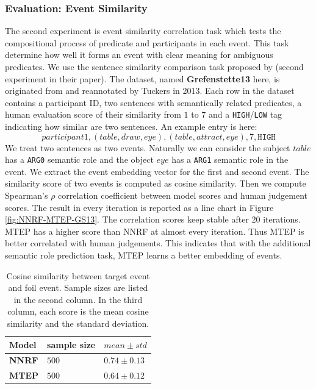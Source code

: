 \documentclass[a4paper]{article}
\begin{document}
\subsubsection{Evaluation: Event Similarity} \label{sec:comp-eventsim}
The second experiment is event similarity correlation task which tests the compositional process of predicate and participants in each event. This task determine how well it forms an event with clear meaning for ambiguous predicates. We use the sentence similarity comparison task proposed by \citet{grefenstette2015concrete} (second experiment in their paper). The dataset, named \textbf{Grefenstette13} here, is originated from \citet{grefenstette2011experimental} and reannotated by Tuckers in 2013. Each row in the dataset contains a participant ID, two sentences with semantically related predicates, a human evaluation score of their similarity from $1$ to $7$ and a \texttt{HIGH}/\texttt{LOW} tag indicating how similar are two sentences. An example entry is here:
\begin{equation} \label{eg:event-sim}
    participant1, (table, draw, eye), (table, attract, eye), 7, \texttt{HIGH}
\end{equation}
We treat two sentences as two events. Naturally we can consider the subject $table$ has a \texttt{ARG0} semantic role and the object $eye$ has a \texttt{ARG1} semantic role in the event. We extract the event embedding vector for the first and second event. The similarity score of two events is computed as cosine similarity. Then we compute Spearman's $\rho$ correlation coefficient between model scores and human judgement scores. The result in every iteration is reported as a line chart in Figure \ref{fig:NNRF-MTEP-GS13}. The correlation scores keep stable after $20$ iterations. MTEP has a higher score than NNRF at almost every iteration. Thus MTEP is better correlated with human judgements. This indicates that with the additional semantic role prediction task, MTEP learns a better embedding of events. 


\begin{table}[t]
\centering
\begin{tabular}{l||l|l}
    \textbf{Model}  &  sample size  &   $mean \pm std$\\ \hline
    \textbf{NNRF}   &  $500$    &   $0.74\pm 0.13$  \\
    \textbf{MTEP}   &  $500$    &   $0.64\pm 0.12$  \\
\end{tabular}
\caption{\label{tab:foil-mtep} Cosine similarity between target event and foil event. Sample sizes are listed in the second column. In the third column, each score is the mean cosine similarity and the standard deviation. }
\end{table}
% 
% 
% 
%
\end{document}
